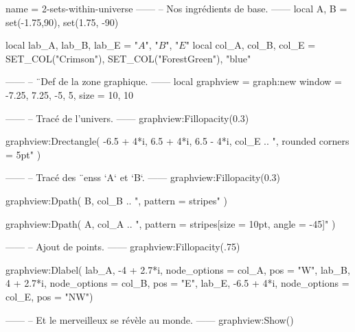 \documentclass{standalone}
\begin{document}
\begin{luadraw}{name = 2-sets-within-universe}
------
-- Nos ingrédients de base.
------
local A, B = set(-1.75,90), set(1.75, -90)

local lab_A, lab_B, lab_E = "$A$", "$B$", "$E$"
local col_A, col_B, col_E = SET_COL("Crimson"), SET_COL("ForestGreen"), "blue"

------
-- ¨Def de la zone graphique.
------
local graphview = graph:new{
  window = {-7.25, 7.25, -5, 5},
  size   = {10, 10}
}

------
-- Tracé de l'univers.
------
graphview:Fillopacity(0.3)

graphview:Drectangle(
  -6.5 + 4*i, 6.5 + 4*i, 6.5 - 4*i,
  col_E .. ", rounded corners = 5pt"
)

------
-- Tracé des ¨enss `A` et `B`.
------
graphview:Fillopacity(0.3)

graphview:Dpath(
  B,
  col_B .. ", pattern = stripes"
)

graphview:Dpath(
  A,
  col_A .. ", pattern = {stripes[size = 10pt, angle = -45]}"
)

------
-- Ajout de points.
------
graphview:Fillopacity(.75)

graphview:Dlabel(
  lab_A, -4 + 2.7*i, {node_options = col_A, pos = "W"},
  lab_B,  4 + 2.7*i, {node_options = col_B, pos = "E"},
  lab_E, -6.5 + 4*i, {node_options = col_E, pos = "NW"})

------
-- Et le merveilleux se révèle au monde.
------
graphview:Show()
\end{luadraw}
\end{document}
